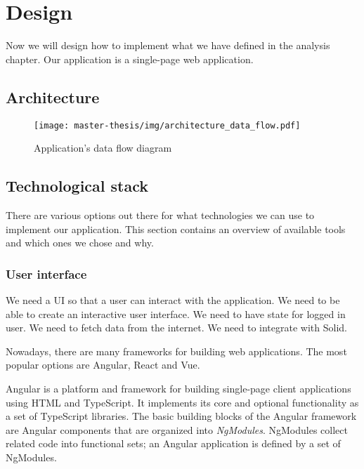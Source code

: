 \chapter{Design}
Now we will design how to implement what we have defined in the analysis chapter.
Our application is a single-page web application.

\section{Architecture}
\begin{figure}[h]
  \centering
  \texttt{[image: master-thesis/img/architecture\_data\_flow.pdf]}
  \caption{Application's data flow diagram}
\end{figure}


\section{Technological stack}
There are various options out there for what technologies we can use to implement our application.
This section contains an overview of available tools and which ones we chose and why.

\subsection{User interface}
  We need a UI so that a user can interact with the application.
  We need to be able to create an interactive user interface.
  We need to have state for logged in user.
  We need to fetch data from the internet.
  We need to integrate with Solid.

  Nowadays, there are many frameworks for building web applications.
  The most popular options are Angular, React and Vue.

  Angular is a platform and framework for building single-page client applications using HTML and TypeScript. 
  It implements its core and optional functionality as a set of TypeScript libraries. 
  The basic building blocks of the Angular framework are Angular components that are organized into \emph{NgModules}. 
  NgModules collect related code into functional sets; an Angular application is defined by a set of NgModules.

